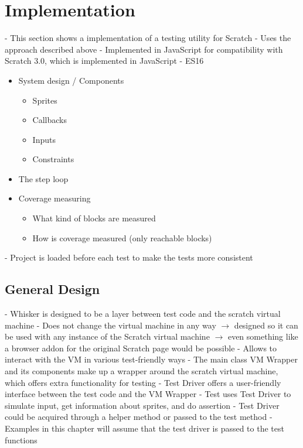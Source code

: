 \chapter{Implementation}

- This section shows a implementation of a testing utility for Scratch
- Uses the approach described above
- Implemented in JavaScript for compatibility with Scratch 3.0, which is implemented in JavaScript
- ES16

\begin{itemize}
    \item System design / Components
        \begin{itemize}
            \item Sprites
            \item Callbacks
            \item Inputs
            \item Constraints
        \end{itemize}
    \item The step loop
    \item Coverage measuring
        \begin{itemize}
            \item What kind of blocks are measured
            \item How is coverage measured (only reachable blocks)
        \end{itemize}
\end{itemize}

- Project is loaded before each test to make the tests more consistent

\section{General Design}

- Whisker is designed to be a layer between test code and the scratch virtual machine
- Does not change the virtual machine in any way
    $\rightarrow$ designed so it can be used with any instance of the Scratch virtual machine
    $\rightarrow$ even something like a browser addon for the original Scratch page would be possible
- Allows to interact with the VM in various test-friendly ways
- The main class VM Wrapper and its components make up a wrapper around the scratch virtual machine,
  which offers extra functionality for testing
- Test Driver offers a user-friendly interface between the test code and the VM Wrapper
- Test uses Test Driver to simulate input, get information about sprites, and do assertion
- Test Driver could be acquired through a helper method or passed to the test method
    - Examples in this chapter will assume that the test driver is passed to the test functions

